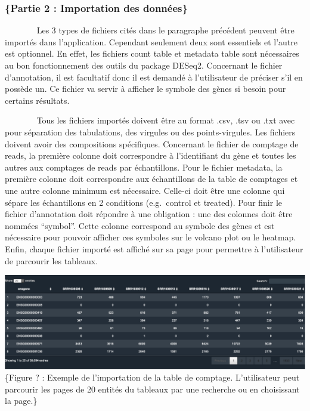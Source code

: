 \documentclass[
  12pt,
]{article}
\begin{document}
\hypertarget{partie-2-importation-des-donnuxe9es}{%
\subsubsection{\texorpdfstring{\normalsize\{Partie 2 : Importation des
données\}}{\{Partie 2 : Importation des données\}}}\label{partie-2-importation-des-donnuxe9es}}

~~~~~~~ Les 3 types de fichiers cités dans le paragraphe précédent
peuvent être importés dans l'application. Cependant seulement deux sont
essentiels et l'autre est optionnel. En effet, les fichiers count table
et metadata table sont nécessaires au bon fonctionnement des outils du
package DESeq2. Concernant le fichier d'annotation, il est facultatif
donc il est demandé à l'utilisateur de préciser s'il en possède un. Ce
fichier va servir à afficher le symbole des gènes si besoin pour
certains résultats.

\par

~~~~~~~ Tous les fichiers importés doivent être au format .csv, .tsv ou
.txt avec pour séparation des tabulations, des virgules ou des
points-virgules. Les fichiers doivent avoir des compositions
spécifiques. Concernant le fichier de comptage de reads, la première
colonne doit correspondre à l'identifiant du gène et toutes les autres
aux comptages de reads par échantillons. Pour le fichier metadata, la
première colonne doit correspondre aux échantillons de la table de
comptages et une autre colonne minimum est nécessaire. Celle-ci doit
être une colonne qui sépare les échantillons en 2 conditions
(e.g.~control et treated). Pour finir le fichier d'annotation doit
répondre à une obligation : une des colonnes doit être nommées
``symbol''. Cette colonne correspond au symbole des gènes et est
nécessaire pour pouvoir afficher ces symboles sur le volcano plot ou le
heatmap. Enfin, chaque fichier importé est affiché sur sa page pour
permettre à l'utilisateur de parcourir les tableaux.

\singlespacing

\includegraphics[width=\textwidth]{exTable.png} \sffamily\small\{Figure
? : Exemple de l'importation de la table de comptage. L'utilisateur peut
parcourir les pages de 20 entités du tableaux par une recherche ou en
choisissant la page.\}
\end{document}

